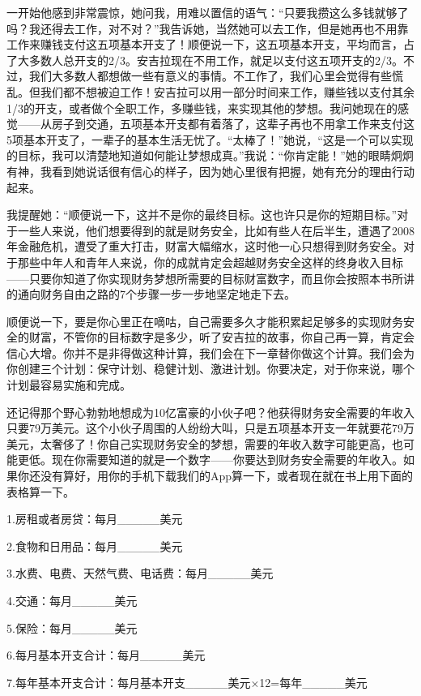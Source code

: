 一开始他感到非常震惊，她问我，用难以置信的语气：“只要我攒这么多钱就够了吗？我还得去工作，对不对？”我告诉她，当然她可以去工作，但是她再也不用靠工作来赚钱支付这五项基本开支了！顺便说一下，这五项基本开支，平均而言，占了大多数人总开支的2/3。安吉拉现在不用工作，就足以支付这五项开支的2/3。不过，我们大多数人都想做一些有意义的事情。不工作了，我们心里会觉得有些慌乱。但我们都不想被迫工作！安吉拉可以用一部分时间来工作，赚些钱以支付其余1/3的开支，或者做个全职工作，多赚些钱，来实现其他的梦想。我问她现在的感觉——从房子到交通，五项基本开支都有着落了，这辈子再也不用拿工作来支付这5项基本开支了，一辈子的基本生活无忧了。“太棒了！”她说，“这是一个可以实现的目标，我可以清楚地知道如何能让梦想成真。”我说：“你肯定能！”她的眼睛炯炯有神，我看到她说话很有信心的样子，因为她心里很有把握，她有充分的理由行动起来。

我提醒她：“顺便说一下，这并不是你的最终目标。这也许只是你的短期目标。”对于一些人来说，他们想要得到的就是财务安全，比如有些人在后半生，遭遇了2008年金融危机，遭受了重大打击，财富大幅缩水，这时他一心只想得到财务安全。对于那些中年人和青年人来说，你的成就肯定会超越财务安全这样的终身收入目标——只要你知道了你实现财务梦想所需要的目标财富数字，而且你会按照本书所讲的通向财务自由之路的7个步骤一步一步地坚定地走下去。

顺便说一下，要是你心里正在嘀咕，自己需要多久才能积累起足够多的实现财务安全的财富，不管你的目标数字是多少，听了安吉拉的故事，你自己再一算，肯定会信心大增。你并不是非得做这种计算，我们会在下一章替你做这个计算。我们会为你创建三个计划：保守计划、稳健计划、激进计划。你要决定，对于你来说，哪个计划最容易实施和完成。

还记得那个野心勃勃地想成为10亿富豪的小伙子吧？他获得财务安全需要的年收入只要79万美元。这个小伙子周围的人纷纷大叫，只是五项基本开支一年就要花79万美元，太奢侈了！你自己实现财务安全的梦想，需要的年收入数字可能更高，也可能更低。现在你需要知道的就是一个数字——你要达到财务安全需要的年收入。如果你还没有算好，用你的手机下载我们的App算一下，或者现在就在书上用下面的表格算一下。

1.房租或者房贷：每月\_\_\_\_\_美元

2.食物和日用品：每月\_\_\_\_\_美元

3.水费、电费、天然气费、电话费：每月\_\_\_\_\_美元

4.交通：每月\_\_\_\_\_美元

5.保险：每月\_\_\_\_\_美元

6.每月基本开支合计：每月\_\_\_\_\_美元

7.每年基本开支合计：每月基本开支\_\_\_\_\_美元×12=每年\_\_\_\_\_美元

